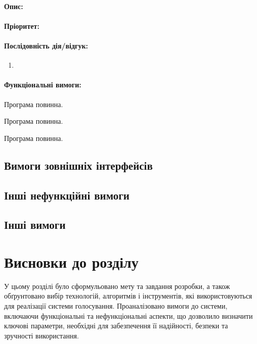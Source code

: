 \documentclass[14pt]{extreport}
\newcounter{req}[subsubsection]
\newcommand\req{\stepcounter{req}\arabic{req}}
\begin{document}
  \paragraph{Опис:}
  
  \paragraph{Пріоритет:}
  
  \paragraph{Послідовність дія/відгук:}
  \begin{enumerate}
    \item 
  \end{enumerate}
  
  \paragraph{Функціональні вимоги:}
  \begin{list}{REQ-.\req:}{}
    \item Програма повинна.
    \item Програма повинна.
    \item Програма повинна.
  \end{list}

  \subsection{Вимоги зовнішніх інтерфейсів}  

  \subsection{Інші нефункційні вимоги}

  \subsection{Інші вимоги}
  
  \section{Висновки до розділу}
  
  У цьому розділі було сформульовано мету та завдання розробки, а також обґрунтовано вибір технологій, алгоритмів і інструментів, які використовуються для реалізації системи голосування. Проаналізовано вимоги до системи, включаючи функціональні та нефункціональні аспекти, що дозволило визначити ключові параметри, необхідні для забезпечення її надійності, безпеки та зручності використання. 
\end{document}
